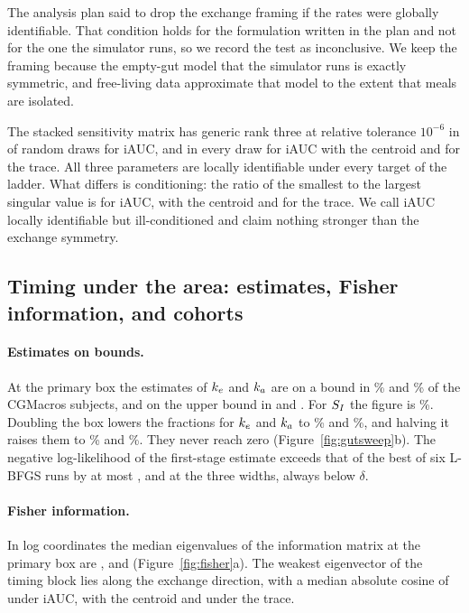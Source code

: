 The analysis plan said to drop the exchange framing if the rates were globally identifiable. That condition holds for
the formulation written in the plan and not for the one the simulator runs, so we record the test as inconclusive. We
keep the framing because the empty-gut model that the simulator runs is exactly symmetric, and free-living data
approximate that model to the extent that meals are isolated.

The stacked sensitivity matrix has generic rank three at relative tolerance $10^{-6}$ in \resRankFullIauc{} of
\resRankDrawsIauc{} random draws for iAUC, and in every draw for iAUC with the centroid and for the trace. All three
parameters are locally identifiable under every target of the ladder. What differs is conditioning: the ratio of the
smallest to the largest singular value is \resRankRatioIauc{} for iAUC, \resRankRatioCentroid{} with the centroid and
\resRankRatioTrace{} for the trace. We call iAUC locally identifiable but ill-conditioned and claim nothing stronger
than the exchange symmetry.

\subsection{Timing under the area: estimates, Fisher information, and cohorts}
\label{apx:timing}

\paragraph{Estimates on bounds.}
At the primary box the estimates of $k_e$ and $k_a$ are on a bound in \resPinnedFracKeOne\% and \resPinnedFracKaOne\%
of the \resSubjectsOne{} CGMacros subjects, and on the upper bound in \resPinnedUpperKeOne{} and
\resPinnedUpperKaOne{}. For $S_I$ the figure is \resPinnedFracSIOne\%. Doubling the box lowers the fractions for $k_e$
and $k_a$ to \resPinnedFracKeTwo\% and \resPinnedFracKaTwo\%, and halving it raises them to \resPinnedFracKeHalf\% and
\resPinnedFracKaHalf\%. They never reach zero (Figure~\ref{fig:gutsweep}b). The negative log-likelihood of the
first-stage estimate exceeds that of the best of six L-BFGS runs by at most
\resOptGapMaxHalf, \resOptGapMaxOne{} and \resOptGapMaxTwo{} at the three widths, always below $\delta$.

\paragraph{Fisher information.}
In log coordinates the median eigenvalues of the information matrix at the primary box are \resEigMedianOne,
\resEigMedianTwo{} and \resEigMedianThree{} (Figure~\ref{fig:fisher}a). The weakest eigenvector of the timing block
lies along the exchange direction, with a median absolute cosine of \resCosineIaucOne{} under iAUC,
\resCosineCentroidOne{} with the centroid and \resCosineTraceOne{} under the trace.

